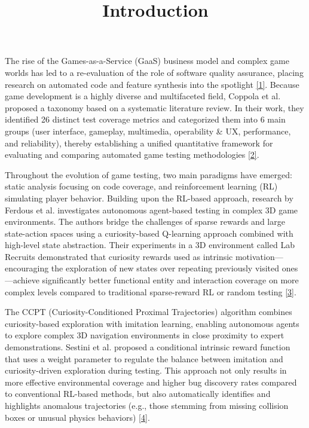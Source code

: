\documentclass[12pt]{article}
\title{Introduction}
\date{}
\begin{document}
\maketitle

The rise of the Games-as-a-Service (GaaS) business model and complex game worlds has led to a re-evaluation of the role of software quality assurance, placing research on automated code and feature synthesis into the spotlight \hyperref[ref-1]{[1]}. Because game development is a highly diverse and multifaceted field, Coppola et al. proposed a taxonomy based on a systematic literature review. In their work, they identified 26 distinct test coverage metrics and categorized them into 6 main groups (user interface, gameplay, multimedia, operability \& UX, performance, and reliability), thereby establishing a unified quantitative framework for evaluating and comparing automated game testing methodologies \hyperref[ref-2]{[2]}.

Throughout the evolution of game testing, two main paradigms have emerged: static analysis focusing on code coverage, and reinforcement learning (RL) simulating player behavior. Building upon the RL-based approach, research by Ferdous et al. investigates autonomous agent-based testing in complex 3D game environments. The authors bridge the challenges of sparse rewards and large state-action spaces using a curiosity-based Q-learning approach combined with high-level state abstraction. Their experiments in a 3D environment called Lab Recruits demonstrated that curiosity rewards used as intrinsic motivation---encouraging the exploration of new states over repeating previously visited ones---achieve significantly better functional entity and interaction coverage on more complex levels compared to traditional sparse-reward RL or random testing \hyperref[ref-3]{[3]}.

The CCPT (Curiosity-Conditioned Proximal Trajectories) algorithm combines curiosity-based exploration with imitation learning, enabling autonomous agents to explore complex 3D navigation environments in close proximity to expert demonstrations. Sestini et al. proposed a conditional intrinsic reward function that uses a weight parameter to regulate the balance between imitation and curiosity-driven exploration during testing. This approach not only results in more effective environmental coverage and higher bug discovery rates compared to conventional RL-based methods, but also automatically identifies and highlights anomalous trajectories (e.g., those stemming from missing collision boxes or unusual physics behaviors) \hyperref[ref-4]{[4]}.
\end{document}

